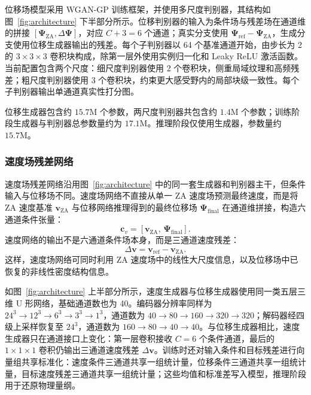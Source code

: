 位移场模型采用 WGAN-GP 训练框架\citep{gulrajani2017improved}，并使用多尺度判别器\citep{wang2018high}，其结构如图~\ref{fig:architecture} 下半部分所示。位移判别器的输入为条件场与残差场在通道维的拼接 $[\boldsymbol{\Psi}_{\mathrm{ZA}}, \Delta\boldsymbol{\Psi}]$，对应 $C+3=6$ 个通道；真实分支使用 $\boldsymbol{\Psi}_{\mathrm{ref}}-\boldsymbol{\Psi}_{\mathrm{ZA}}$，生成分支使用位移生成器输出的残差。每个子判别器以 64 个基准通道开始，由步长为 2 的 $3\times3\times3$ 卷积块构成，除第一层外使用实例归一化和 Leaky ReLU 激活函数。当前配置包含两个尺度：细尺度判别器使用 2 个卷积块，侧重局域纹理和高频残差；粗尺度判别器使用 3 个卷积块，约束更大感受野内的局部块级一致性。每个子判别器输出单通道真实性打分图。

位移生成器包含约 $15.7\mathrm{M}$ 个参数，两尺度判别器共包含约 $1.4\mathrm{M}$ 个参数；训练阶段生成器与判别器总参数量约为 $17.1\mathrm{M}$。推理阶段仅使用生成器，参数量约 $15.7\mathrm{M}$。

\subsubsection{速度场残差网络}

速度场残差网络沿用图~\ref{fig:architecture} 中的同一套生成器和判别器主干，但条件输入与位移场不同。速度场网络不直接从单一 ZA 速度场预测最终速度，而是将 ZA 速度基准 $\boldsymbol{v}_{\mathrm{ZA}}$ 与位移网络推理得到的最终位移场 $\boldsymbol{\Psi}_{\mathrm{final}}$ 在通道维拼接，构造六通道条件张量：
\begin{equation}
  \boldsymbol{c}_{v} = \left[\boldsymbol{v}_{\mathrm{ZA}},\,\boldsymbol{\Psi}_{\mathrm{final}}\right].
\end{equation}
速度网络的输出不是六通道条件场本身，而是三通道速度残差：
\begin{equation}
  \Delta\boldsymbol{v} = \boldsymbol{v}_{\mathrm{ref}} - \boldsymbol{v}_{\mathrm{ZA}}.
\end{equation}
这样，速度场网络可同时利用 ZA 速度场中的线性大尺度信息，以及位移场中已恢复的非线性密度结构信息。

如图~\ref{fig:architecture} 上半部分所示，速度生成器与位移生成器使用同一类五层三维 U 形网络，基础通道数也为 40。编码器分辨率同样为 $24^3\rightarrow12^3\rightarrow6^3\rightarrow3^3\rightarrow1^3$，通道数为 $40\rightarrow80\rightarrow160\rightarrow320\rightarrow320$；解码器经四级上采样恢复至 $24^3$，通道数为 $160\rightarrow80\rightarrow40\rightarrow40$。与位移生成器相比，速度生成器只在通道接口上变化：第一层卷积接收 $C=6$ 个条件通道，最后的 $1\times1\times1$ 卷积仍输出三通道速度残差 $\Delta\boldsymbol{v}$。训练时还对输入条件和目标残差进行向量组共享标准化：速度条件三通道共享一组统计量，位移条件三通道共享一组统计量，目标速度残差三通道共享一组统计量；这些均值和标准差写入模型，推理阶段用于还原物理量纲。


